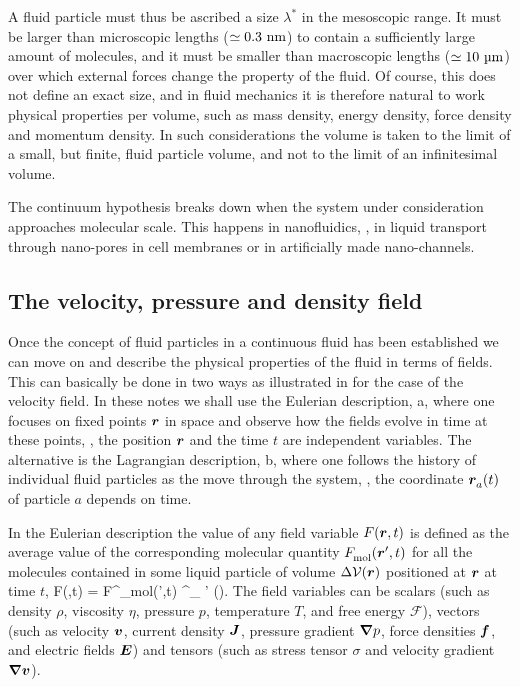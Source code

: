 A fluid particle must thus be ascribed a size $\lambda^*$ in the
mesoscopic range. It must be larger than
microscopic lengths ($\simeq 0.3~\textrm{nm}$) to contain a sufficiently
large amount of molecules, and it must be smaller than macroscopic
lengths ($\simeq 10~\SImum$) over which external forces change the
property of the fluid. Of course, this does not define an exact
size, and in fluid mechanics it is therefore natural to work
physical properties per volume, such as mass density, energy density, force
density and momentum density. In such considerations the volume is taken to the limit
of a small, but finite, fluid particle volume, and not to the
limit of an infinitesimal volume.

The continuum hypothesis breaks down when the system under
consideration approaches molecular scale. This happens in
nanofluidics, \eg, in liquid transport through nano-pores in cell
membranes or in artificially made nano-channels.

\subsection{The velocity, pressure and density field}


Once the concept of fluid particles in a continuous fluid has been
established we can move on and describe the physical properties of
the fluid in terms of fields. This can basically be done in two
ways as illustrated in  for the case of the
velocity field. In these notes we shall use the Eulerian
description, a, where one focuses on fixed points $\bm{r}$ in
space and observe how the fields evolve in time at these points,
\ie, the position $\bm{r}$ and the time $t$ are independent
variables. The alternative is the Lagrangian description,
b, where one follows the history of
individual fluid particles as the move through the system, \ie,
the coordinate $\bm{r}^{{}}_a(t)$ of particle $a$ depends on time.

In the Eulerian description the value of any field variable
$F(\bm{r},t)$ is defined as the average value of the corresponding
molecular quantity $F^{{}}_\textrm{mol}(\bm{r}',t)$ for all the
molecules contained in some liquid particle of volume $\Delta
\mathcal{V}(\bm{r})$ positioned at $\bm{r}$ at time $t$,
%
 F(\rrr,t) = \big\langle F^{{}}_\textrm{mol}(\rrr',t)
 \big\rangle^{{}}_ {\rrr' \in \Delta \vol(\rrr)}.
 \eeq
%
The field variables can be scalars (such as density $\rho$,
viscosity $\eta$, pressure $p$, temperature $T$, and free energy
$\mathcal{F}$), vectors (such as velocity
$\bm{v}$, current density $\bm{J}$, pressure gradient $\boldsymbol{\nabla} p$,
force densities $\bm{f}$, and electric fields $\bm{E}$) and tensors (such as stress tensor $\sigma$
and velocity gradient $\boldsymbol{\nabla} \bm{v}$).

